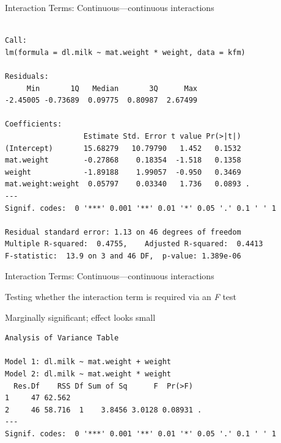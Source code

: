 \documentclass[10pt,ignorenonframetext,compress, aspectratio=169]{beamer}
\begin{document}
\begin{frame}[fragile]{Interaction Terms: Continuous---continuous
interactions}

\scriptsize

\begin{verbatim}

Call:
lm(formula = dl.milk ~ mat.weight * weight, data = kfm)

Residuals:
     Min       1Q   Median       3Q      Max 
-2.45005 -0.73689  0.09775  0.80987  2.67499 

Coefficients:
                  Estimate Std. Error t value Pr(>|t|)  
(Intercept)       15.68279   10.79790   1.452   0.1532  
mat.weight        -0.27868    0.18354  -1.518   0.1358  
weight            -1.89188    1.99057  -0.950   0.3469  
mat.weight:weight  0.05797    0.03340   1.736   0.0893 .
---
Signif. codes:  0 '***' 0.001 '**' 0.01 '*' 0.05 '.' 0.1 ' ' 1

Residual standard error: 1.13 on 46 degrees of freedom
Multiple R-squared:  0.4755,    Adjusted R-squared:  0.4413 
F-statistic:  13.9 on 3 and 46 DF,  p-value: 1.389e-06
\end{verbatim}

\normalsize

\end{frame}

\begin{frame}[fragile]{Interaction Terms: Continuous---continuous
interactions}

Testing whether the interaction term is required via an \emph{F} test

Marginally significant; effect looks small

\scriptsize

\begin{verbatim}
Analysis of Variance Table

Model 1: dl.milk ~ mat.weight + weight
Model 2: dl.milk ~ mat.weight * weight
  Res.Df    RSS Df Sum of Sq      F  Pr(>F)  
1     47 62.562                              
2     46 58.716  1    3.8456 3.0128 0.08931 .
---
Signif. codes:  0 '***' 0.001 '**' 0.01 '*' 0.05 '.' 0.1 ' ' 1
\end{verbatim}

\normalsize

\end{frame}
\end{document}
